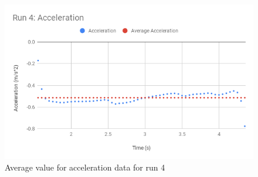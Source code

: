 \begin{figure}[ht]
    \centering
    \includegraphics[scale=0.71]{image/02-incline/Run-4-a.png}
    \caption{Average value for acceleration data for run 4}
    \label{figure:02.fit.a}
\end{figure}
